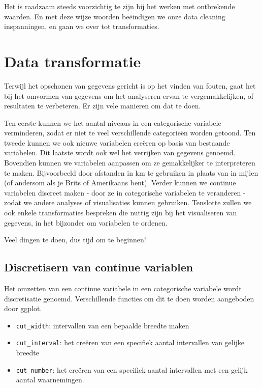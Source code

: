 \documentclass[]{tufte-book}
\providecommand{\tightlist}{%
  \setlength{\itemsep}{0pt}\setlength{\parskip}{0pt}}
\begin{document}
Het is raadzaam steeds voorzichtig te zijn bij het werken met ontbrekende waarden. En met deze wijze woorden beëindigen we onze data cleaning inspanningen, en gaan we over tot transformaties.

\hypertarget{data-transformatie}{%
\section{Data transformatie}\label{data-transformatie}}

Terwijl het opschonen van gegevens gericht is op het vinden van fouten, gaat het bij het omvormen van gegevens om het analyseren ervan te vergemakkelijken, of resultaten te verbeteren. Er zijn vele manieren om dat te doen.

Ten eerste kunnen we het aantal niveaus in een categorische variabele verminderen, zodat er niet te veel verschillende categorieën worden getoond. Ten tweede kunnen we ook nieuwe variabelen creëren op basis van bestaande variabelen. Dit laatste wordt ook wel het verrijken van gegevens genoemd. Bovendien kunnen we variabelen aanpassen om ze gemakkelijker te interpreteren te maken. Bijvoorbeeld door afstanden in km te gebruiken in plaats van in mijlen (of andersom als je Brits of Amerikaans bent). Verder kunnen we continue variabelen discreet maken - door ze in categorische variabelen te veranderen - zodat we andere analyses of visualisaties kunnen gebruiken. Tenslotte zullen we ook enkele transformaties bespreken die nuttig zijn bij het visualiseren van gegevens, in het bijzonder om variabelen te ordenen.

Veel dingen te doen, dus tijd om te beginnen!

\hypertarget{discretisern-van-continue-variablen}{%
\subsection{Discretisern van continue variablen}\label{discretisern-van-continue-variablen}}

Het omzetten van een continue variabele in een categorische variabele wordt discretisatie genoemd. Verschillende functies om dit te doen worden aangeboden door ggplot.

\begin{itemize}
\tightlist
\item
  \texttt{cut\_width}: intervallen van een bepaalde breedte maken
\item
  \texttt{cut\_interval}: het creëren van een specifiek aantal intervallen van gelijke breedte
\item
  \texttt{cut\_number}: het creëren van een specifiek aantal intervallen met een gelijk aantal waarnemingen.
\end{itemize}
\end{document}
